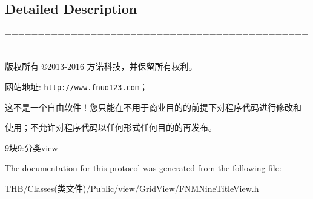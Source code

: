 \subsection{Detailed Description}
============================================================================

版权所有 ©2013-\/2016 方诺科技，并保留所有权利。

网站地址\+: \href{http://www.fnuo123.com}{\tt http\+://www.\+fnuo123.\+com}； 



这不是一个自由软件！您只能在不用于商业目的的前提下对程序代码进行修改和

使用；不允许对程序代码以任何形式任何目的的再发布。 



9块9\+:分类view 

The documentation for this protocol was generated from the following file\+:\begin{DoxyCompactItemize}
\item 
T\+H\+B/\+Classes(类文件)/\+Public/view/\+Grid\+View/F\+N\+M\+Nine\+Title\+View.\+h\end{DoxyCompactItemize}
